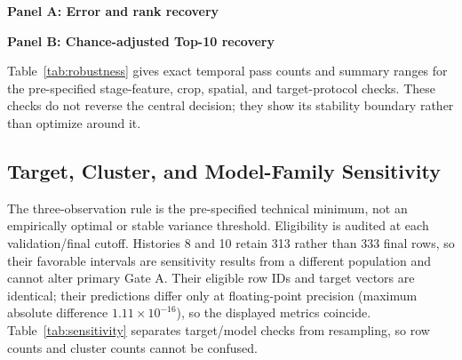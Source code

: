 \documentclass[conference]{IEEEtran}
\renewcommand{\arraystretch}{0.98}
\begin{document}
\begin{table}[t]
\centering
\caption{Tail components on train-only targets. Panel A reports error and rank
recovery; Panel B reports chance-adjusted Top-10 recovery. $H$ is the
hypergeometric probability and $P$ is the within-year permutation probability.
The Top-10 component passes only when lift $>1$, the lower lift CI $>1$, and both
$H$ and $P$ are $<.05$. Only $z<-1$ is primary; severe tails are sensitivities.}
\label{tab:tail}
\footnotesize
\renewcommand{\arraystretch}{1.08}
\textbf{Panel A: Error and rank recovery}\par\smallskip

\par\medskip
\textbf{Panel B: Chance-adjusted Top-10 recovery}\par\smallskip

\end{table}

\begin{table}[t]
\centering
\caption{Gate decision components. Gate A controls substantive observed-event
claims; primary Gate B1 is additionally required for weather-specific claims;
Gate B2 is sensitivity only.}
\label{tab:gateab}
\scriptsize
\resizebox{\textwidth}{!}{}
\end{table}

Table~\ref{tab:robustness} gives exact temporal pass counts and summary ranges for
the pre-specified stage-feature, crop, spatial, and target-protocol checks. These
checks do not reverse the central decision; they show its stability boundary rather
than optimize around it.

\begin{table}[t]
\centering
\caption{Robustness and protocol sensitivity. Exact criteria, row-level outputs,
and settings are retained in the audit artifact.}
\label{tab:robustness}
\footnotesize
\renewcommand{\arraystretch}{1.08}

\end{table}

\subsection{Target, Cluster, and Model-Family Sensitivity}
The three-observation rule is the pre-specified technical minimum, not an
empirically optimal or stable variance threshold. Eligibility is audited at each validation/final
cutoff. Histories 8 and 10 retain 313 rather than 333 final rows, so their favorable
intervals are sensitivity results from a different population and cannot alter
primary Gate A. Their eligible row IDs and target vectors are identical; their
predictions differ only at floating-point precision (maximum absolute difference
$1.11\times10^{-16}$), so the displayed metrics coincide. Table~\ref{tab:sensitivity}
separates target/model checks from resampling, so row counts and cluster counts
cannot be confused.
\end{document}

